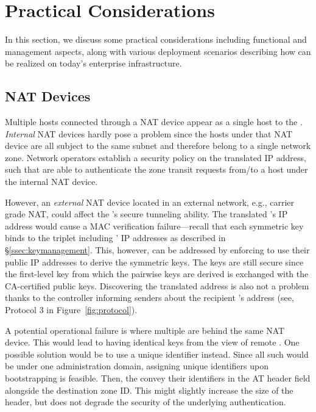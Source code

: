 \chapter{Practical Considerations}
\label{practical}

In this section, we discuss some practical considerations including functional and 
management aspects, along with various deployment scenarios describing how \name can
be realized on today's enterprise infrastructure. 


\section{NAT Devices}
\label{sec:nat}
Multiple hosts connected through a NAT device appear as a single host to the
\tp. \textit{Internal} NAT devices hardly pose a problem since the hosts under that NAT 
device are all subject to the same subnet and therefore belong to a single network zone. 
Network operators establish a security policy on the translated IP address, such 
that \tps are able to authenticate the zone transit requests from/to a host under the
internal NAT device.

However, an \textit{external} NAT device located in an external network, e.g., carrier grade NAT, 
could affect the \tp's secure tunneling ability. The translated \tp's IP address
would cause a MAC verification failure---recall that each symmetric key binds to the
triplet including \tps' IP addresses as described in \S\ref{ssec:keymanagement}. 
This, however, can be addressed by enforcing \tps to use their public IP addresses
to derive the symmetric keys. The keys are still secure since the first-level key
from which the pairwise keys are derived is exchanged with the CA-certified public
keys. Discovering the translated \tp address is also not a problem thanks to
the controller informing senders about the recipient \tp's address (see, Protocol 3 in 
Figure~\ref{fig:protocol}). 

A potential operational failure is where multiple \tps are behind the same NAT device.
This would lead to \tps having identical keys from the view of remote \tps. One possible solution
would be to use a unique \tp identifier instead. Since all such \tps would be under one administration domain, assigning unique \tp identifiers upon bootstrapping is feasible. Then, the \tps convey their identifiers in the AT header field alongside the destination zone ID. This
might slightly increase the size of the header, but does not degrade the security of
the underlying authentication.


